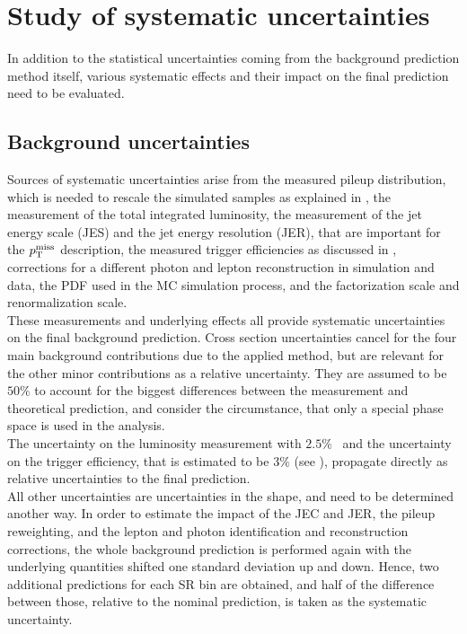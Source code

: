 \section{Study of systematic uncertainties}\label{sec:Syst}
In addition to the statistical uncertainties coming from the background prediction method itself, various systematic effects and their impact on the final prediction need to be evaluated.

\subsection{Background uncertainties}
Sources of systematic uncertainties arise from the measured pileup distribution,  which is needed to rescale the simulated samples as explained in , the measurement of the total integrated luminosity, the measurement of the jet energy scale (JES) and the jet energy resolution (JER), that are important for the $p_{\mathrm{T}}^\text{miss}$ description, the measured trigger efficiencies as discussed in , corrections for a different photon and lepton reconstruction in simulation and data, the PDF used in the MC simulation process, and the factorization scale and renormalization scale.\\
These measurements and underlying effects all provide systematic uncertainties on the final background prediction. Cross section uncertainties cancel for the four main background contributions due to the applied method, but are relevant for the other minor contributions as a relative uncertainty. They are assumed to be $50\%$ to account for the biggest differences between the measurement and theoretical prediction, and consider the circumstance, that only a special phase space is used in the analysis.\\
The uncertainty on the luminosity measurement with $2.5\%$~\cite{LumiUncert} and the uncertainty on the trigger efficiency, that is estimated to be $3\%$ (see ), propagate directly as relative uncertainties to the final prediction.\\
All other uncertainties are uncertainties in the shape, and need to be determined another way. In order to estimate the impact of the JEC and JER, the pileup reweighting, and the lepton and photon identification and reconstruction corrections, the whole background prediction is performed again with the underlying quantities shifted one standard deviation up and down. Hence, two additional predictions for each SR bin are obtained, and half of the difference between those, relative to the nominal prediction, is taken as the systematic uncertainty.\\
